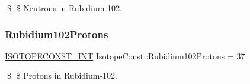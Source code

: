 \$ \$ Neutrons in Rubidium-\/102. \mbox{\label{group___isotope_const-_rubidium-_rb102_gae5bdb502a186df1a4aae89d92e2ee92b}} 
\subsubsection{\texorpdfstring{Rubidium102\+Protons}{Rubidium102Protons}}
{\footnotesize\ttfamily \mbox{\hyperlink{group___isotope_const-_macros_ga5f18360b3e99483a35c32d789e62621c}{I\+S\+O\+T\+O\+P\+E\+C\+O\+N\+S\+T\+\_\+\+I\+NT}} Isotope\+Const\+::\+Rubidium102\+Protons = 37}

\$ \$ Protons in Rubidium-\/102. 